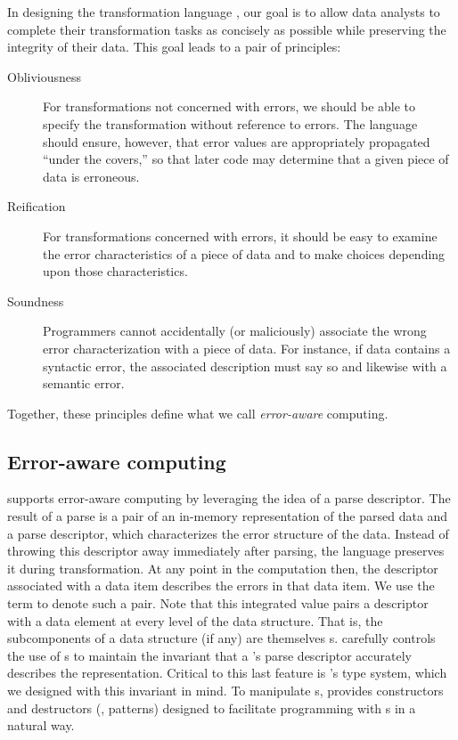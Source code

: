 In designing the transformation language \datatype{}, our goal is to allow data analysts to complete their transformation tasks as concisely as possible while preserving the integrity of their data.  This goal leads to a pair of principles:
%
\begin{description}
\item[Obliviousness] For transformations not concerned with errors, we should be able to specify the transformation without reference to errors.  The language should ensure, however, that error values are appropriately propagated ``under the covers,'' so that later code may determine that a given piece of data is erroneous.
\item[Reification] For transformations concerned with errors, it should be easy to examine the error characteristics of a piece of data and to make choices depending upon those characteristics.
\item[Soundness] Programmers cannot accidentally (or
maliciously) associate the wrong error characterization with a piece of
data.  For instance, if data contains a syntactic error, the associated
description must say so and likewise with a semantic error.
\end{description}
%
Together, these principles define what we call \textit{error-aware} computing.

\subsection{Error-aware computing}
\datatype{} supports error-aware computing by leveraging the idea of a parse descriptor.   The result of a parse is a pair of an in-memory representation of the parsed data and a parse descriptor, which characterizes the error structure of the data.  Instead of throwing this descriptor away immediately after parsing, the language preserves it during transformation.  At any point in the computation then, the descriptor associated with a data item describes the errors in that data item.  We use the term \pvalue{} to denote such a pair.  Note that this integrated value pairs a descriptor with a data element at every level of the data structure. That is, the subcomponents of a data structure (if any) are themselves \pvalue{}s.
\datatype{} carefully controls the use of \pvalue{}s to maintain the invariant that a \pvalue{}'s parse descriptor accurately describes the representation.
Critical to this last feature is \datatype{}'s type system, which we 
designed with this invariant in mind.
To manipulate \pvalue{}s, \datatype{} provides constructors and destructors (\ie{}, patterns) designed to facilitate programming with \pvalue{}s in a natural way.


